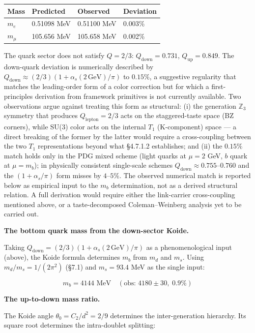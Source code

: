 \documentclass[
]{article}
\begin{document}
\begin{longtable}[]{@{}llll@{}}
\toprule\noalign{}
Mass & Predicted & Observed & Deviation \\
\midrule\noalign{}
\endhead
\bottomrule\noalign{}
\endlastfoot
\(m_e\) & 0.51098 MeV & 0.51100 MeV & 0.003\% \\
\(m_\mu\) & 105.656 MeV & 105.658 MeV & 0.002\% \\
\end{longtable}

The quark sector does not satisfy \(Q = 2/3\):
\(Q_{\text{down}} = 0.731\), \(Q_{\text{up}} = 0.849\). The down-quark
deviation is numerically described by
\(Q_{\text{down}} \approx (2/3)(1 + \alpha_s(2\,\text{GeV})/\pi)\) to
\(0.15\%\), a suggestive regularity that matches the leading-order form
of a color correction but for which a first-principles derivation from
framework primitives is not currently available. Two observations argue
against treating this form as structural: (i) the generation
\(\mathbb{Z}_3\) symmetry that produces \(Q_{\text{lepton}} = 2/3\) acts
on the staggered-taste space (BZ corners), while SU(3) color acts on the
internal \(T_1\) (K-component) space --- a direct breaking of the former
by the latter would require a cross-coupling between the two \(T_1\)
representations beyond what §4.7.1.2 establishes; and (ii) the
\(0.15\%\) match holds only in the PDG mixed scheme (light quarks at
\(\mu = 2\) GeV, \(b\) quark at \(\mu = m_b\)); in physically consistent
single-scale schemes \(Q_{\text{down}} \approx 0.755\)--\(0.760\) and
the \((1+\alpha_s/\pi)\) form misses by \(4\)--\(5\%\). The observed
numerical match is reported below as empirical input to the \(m_b\)
determination, not as a derived structural relation. A full derivation
would require either the link-carrier cross-coupling mentioned above, or
a taste-decomposed Coleman--Weinberg analysis yet to be carried out.

\textbf{The bottom quark mass from the down-sector Koide.}

Taking \(Q_{\text{down}} = (2/3)(1 + \alpha_s(2\,\text{GeV})/\pi)\) as a
phenomenological input (above), the Koide formula determines \(m_b\)
from \(m_d\) and \(m_s\). Using \(m_d/m_s = 1/(2\pi^2)\) (§7.1) and
\(m_s = 93.4\) MeV as the single input:

\[\boxed{m_b = 4144 \text{ MeV} \quad (\text{obs: } 4180 \pm 30, \; 0.9\%)}\]

\textbf{The up-to-down mass ratio.}

The Koide angle \(\theta_0 = C_2/d^2 = 2/9\) determines the
inter-generation hierarchy. Its square root determines the intra-doublet
splitting:
\end{document}
